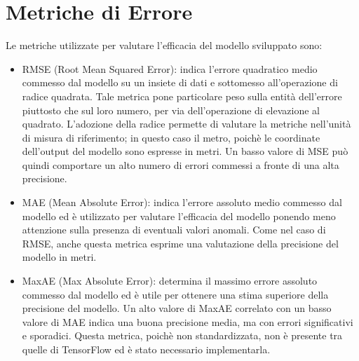 
\chapter{Metriche di Errore}
Le metriche utilizzate per valutare l'efficacia del modello sviluppato sono:
\begin{itemize}
  \item RMSE (Root Mean Squared Error): indica l'errore quadratico medio
    commesso dal modello su un insiete di dati e sottomesso all'operazione di
    radice quadrata. Tale metrica pone particolare peso sulla entità
    dell'errore piuttosto che sul loro numero, per via dell'operazione di
    elevazione al quadrato. L'adozione della radice permette di valutare la
    metriche nell'unità di misura di riferimento; in questo caso il metro,
    poichè le coordinate dell'output del modello sono espresse in metri. Un
    basso valore di MSE può quindi comportare un alto numero di errori commessi
    a fronte di una alta precisione.
  \item MAE (Mean Absolute Error): indica l'errore assoluto medio commesso dal
    modello ed è utilizzato per valutare l'efficacia del modello ponendo meno
    attenzione sulla presenza di eventuali valori anomali. Come nel caso di
    RMSE, anche questa metrica esprime una valutazione della precisione del
    modello in metri.
  \item MaxAE (Max Absolute Error): determina il massimo errore assoluto
    commesso dal modello ed è utile per ottenere una stima superiore
    della precisione del modello. Un alto valore di MaxAE correlato con un
    basso valore di MAE indica una buona precisione media, ma con errori
    significativi e sporadici. Questa metrica, poichè non standardizzata, non è
    presente tra quelle di TensorFlow ed è stato necessario implementarla.
\end{itemize}


